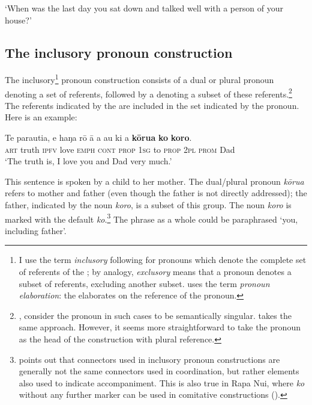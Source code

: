 \glt 
‘When was the last day you sat down and talked well with a person of your house?’ \textstyleExampleref{[R209.032]} 
\z

\subsection{The inclusory pronoun construction}\label{sec:8.10.7}
The inclusory\footnote{\label{fn:449}I use the term \textit{inclusory} following \citet{Lichtenberk2000} for pronouns which denote the complete set of referents of the ; by analogy, \textit{exclusory} means that a pronoun denotes a subset of referents, excluding another subset. \citet[207]{Dixon2010-2} uses the term \textit{pronoun elaboration}: the  elaborates on the reference of the pronoun.} pronoun construction consists of a dual or plural pronoun denoting a set of referents, followed by a  denoting a subset of these referents.\footnote{\label{fn:450}\citet[267]{AndersonKeenan1985}, consider the pronoun in such cases to be semantically singular. \citet{Schwartz1988} takes the same approach. However, it seems more straightforward to take the pronoun as the head of the construction with plural reference.}  The referents indicated by the  are included in the set indicated by the pronoun. Here is an example:

\ea\label{ex:8.211}
\gll Te parauti{\ꞌ}a, e haŋa rō {\ꞌ}ā a au ki a \textbf{kōrua} \textbf{ko} \textbf{koro}. \\
\textsc{art} truth \textsc{ipfv} love \textsc{emph} \textsc{cont} \textsc{prop} \textsc{1sg} to \textsc{prop} \textsc{2pl} \textsc{prom} Dad \\

\glt
‘The truth is, I love you and Dad very much.’ \textstyleExampleref{[R229.498]} 
\z

This sentence is spoken by a child to her mother. The dual/plural pronoun \textit{kōrua} refers to mother and father (even though the father is not directly addressed); the father, indicated by the noun \textit{koro}, is a subset of this group. The noun \textit{koro} is marked with the default  \textit{ko}.\footnote{\label{fn:451}\citet[241]{Schwartz1988} points out that connectors used in inclusory pronoun constructions are generally not the same connectors used in coordination, but rather elements also used to indicate accompaniment. This is also true in Rapa Nui, where \textit{ko} without any further marker can be used in comitative constructions ().} The phrase as a whole could be paraphrased ‘you, including father’. 

